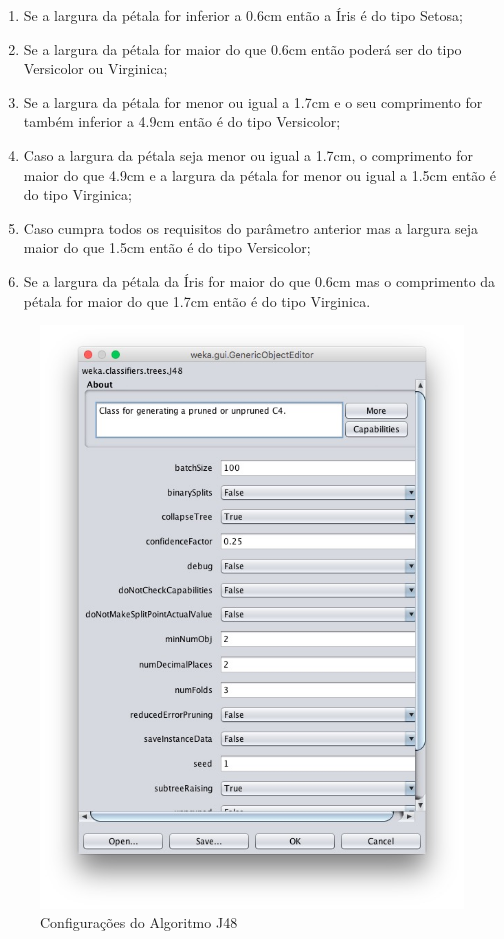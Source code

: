 \begin{enumerate}
  \item Se a largura da pétala for inferior a 0.6cm então a Íris é do tipo Setosa;
  \item Se a largura da pétala for maior do que 0.6cm então poderá ser do tipo Versicolor ou Virginica;
  \item Se a largura da pétala for menor ou igual a 1.7cm e o seu comprimento for também inferior a 4.9cm então é do tipo Versicolor;
  \item Caso a largura da pétala seja menor ou igual a 1.7cm, o comprimento for maior do que 4.9cm e a largura da pétala for menor ou igual a 1.5cm então é do tipo Virginica;
  \item Caso cumpra todos os requisitos do parâmetro anterior mas a largura seja maior do que 1.5cm então é do tipo Versicolor;
  \item Se a largura da pétala da Íris for maior do que 0.6cm mas o comprimento da pétala for maior do que 1.7cm então é do tipo Virginica.
\end{enumerate}


\begin{figure}[H]
    \centering
    \includegraphics[scale=0.5]{tex/img/img4i.jpg}
    \caption{Configurações do Algoritmo J48}
    \label{fig:apos2}
\end{figure}

